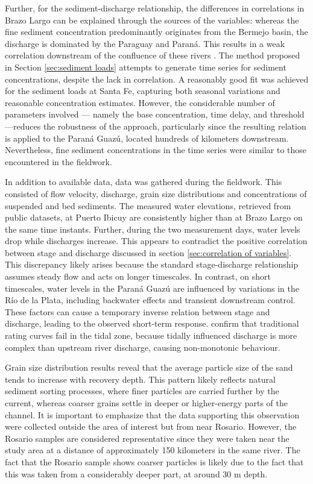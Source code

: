 Further, for the sediment-discharge relationship, the differences in correlations in Brazo Largo can be explained through the sources of the variables: whereas the fine sediment concentration predominantly originates from the Bermejo basin, the discharge is dominated by the Paraguay and Paraná. This results in a weak correlation downstream of the confluence of these rivers \autocite{lopezweibelSourcesTemporalDynamics2022}. The method proposed in Section \ref{sec:sediment loads} attempts to generate time series for sediment concentrations, despite the lack in correlation. A reasonably good fit was achieved for the sediment loads at Santa Fe, capturing both seasonal variations and reasonable concentration estimates. However, the considerable number of parameters involved — namely the base concentration, time delay, and threshold —reduces the robustness of the approach, particularly since the resulting relation is applied to the Paraná Guazú, located hundreds of kilometers downstream. Nevertheless, fine sediment concentrations in the time series were similar to those encountered in the fieldwork. 


In addition to available data, data was gathered during the fieldwork. This consisted of flow velocity, discharge, grain size distributions and concentrations of suspended and bed sediments. The measured water elevations, retrieved from public datasets, at Puerto Ibicuy are consistently higher than at Brazo Largo on the same time instants. Further, during the two measurement days, water levels drop while discharges increase. This appears to contradict the positive correlation between stage and discharge discussed in section \ref{sec:correlation of variables}. This discrepancy likely arises because the standard stage-discharge relationship assumes steady flow and acts on longer timescales. In contrast, on short timescales, water levels in the Paraná Guazú are influenced by variations in the Río de la Plata, including backwater effects and transient downstream control. These factors can cause a temporary inverse relation between stage and discharge, leading to the observed short-term response. \textcite{jonesExpandedRatingCurve2019} confirm that traditional rating curves fail in the tidal zone, because tidally influenced discharge is more complex than upstream river discharge, causing non-monotonic behaviour. 

Grain size distribution results reveal that the average particle size of the sand tends to increase with recovery depth. This pattern likely reflects natural sediment sorting processes, where finer particles are carried further by the current, whereas coarser grains settle in deeper or higher-energy parts of the channel. It is important to emphasize that the data supporting this observation were collected outside the area of interest but from near Rosario. However, the Rosario samples are considered representative since they were taken near the study area at a distance of approximately 150 kilometers in the same river. The fact that the Rosario sample shows coarser particles is likely due to the fact that this was taken from a considerably deeper part, at around 30 m depth. 


